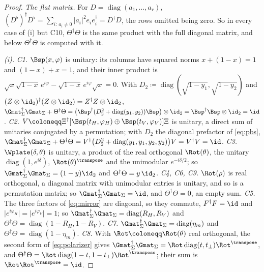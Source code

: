 \begin{proof}
\emph{The flat matrix.} For $D=\operatorname{diag}(a_1,\dots,a_r)$,
$(D^{\flat})^{\dagger}D^{\flat}=\sum_{i:\,a_i\ne0}\lvert a_i\rvert^{2}e_ie_i^{\dagger}
=D^{\dagger}D$, the rows omitted being zero. So in every case of (i) but C10,
$\Theta^{\dagger}\Theta$ is the same product with the full diagonal matrix,
and below $\Theta^{\dagger}\Theta$ is computed with it.

\emph{(i).} \emph{C1.} $\Bsp(x,\varphi)$ is unitary: its columns have
squared norms $x+(1-x)=1$ and $(1-x)+x=1$, and their inner product is
$\sqrt{x}\sqrt{1-x}\,e^{i\varphi}-\sqrt{1-x}\,e^{i\varphi}\sqrt{x}=0$. With
$D_2\coloneqq\operatorname{diag}(\sqrt{1-y_1},\sqrt{1-y_2})$ and
$(Z\otimes\id_2)^{\dagger}(Z\otimes\id_2)=Z^{\dagger}Z\otimes\id_2$,
$\Gmat_\Sigma^{\dagger}\Gmat_\Sigma+\Theta^{\dagger}\Theta
=\big(\Bsp^{\dagger}(D_2^{2}+\operatorname{diag}(y_1,y_2))\Bsp\big)\otimes\id_2
=\Bsp^{\dagger}\Bsp\otimes\id_2=\id$.
\emph{C2.} $V\coloneqq\Xi^{\dagger}[\Bsp(t_H,\varphi_H)\oplus\Bsp(t_V,\varphi_V)]\Xi$
is unitary, a direct sum of unitaries conjugated by a permutation; with
$D_2$ the diagonal prefactor of \eqref{eq:pbs},
$\Gmat_\Sigma^{\dagger}\Gmat_\Sigma+\Theta^{\dagger}\Theta
=V^{\dagger}\big(D_2^{2}+\operatorname{diag}(y_1,y_1,y_2,y_2)\big)V=V^{\dagger}V=\id$.
\emph{C3.} $\Wplate(\delta,\theta)$ is unitary, a product of the real
orthogonal $\Rot(\theta)$, the unitary $\operatorname{diag}(1,e^{i\delta})$,
$\Rot(\theta)^{\transpose}$ and the unimodular $e^{-i\delta/2}$; so
$\Gmat_\Sigma^{\dagger}\Gmat_\Sigma=(1-y)\id_2$ and
$\Theta^{\dagger}\Theta=y\,\id_2$.
\emph{C4, C6, C9.} $\Rot(\rho)$ is real orthogonal, a diagonal matrix with
unimodular entries is unitary, and so is a permutation matrix; so
$\Gmat_\Sigma^{\dagger}\Gmat_\Sigma=\id$, and $\Theta^{\dagger}\Theta=0$, an
empty sum.
\emph{C5.} The three factors of \eqref{eq:mirror} are diagonal, so they
commute, $F^{\dagger}F=\id$ and
$\lvert e^{i\varphi_H}\rvert=\lvert e^{i\varphi_V}\rvert=1$; so
$\Gmat_\Sigma^{\dagger}\Gmat_\Sigma=\operatorname{diag}(R_H,R_V)$ and
$\Theta^{\dagger}\Theta=\operatorname{diag}(1-R_H,1-R_V)$.
\emph{C7.} $\Gmat_\Sigma^{\dagger}\Gmat_\Sigma=\operatorname{diag}(\eta_m)$
and $\Theta^{\dagger}\Theta=\operatorname{diag}(1-\eta_m)$.
\emph{C8.} With $\Rot\coloneqq\Rot(\theta)$ real orthogonal, the second form
of \eqref{eq:polarizer} gives
$\Gmat_\Sigma^{\dagger}\Gmat_\Sigma=\Rot\operatorname{diag}(t,t_\perp)\Rot^{\transpose}$,
and $\Theta^{\dagger}\Theta=\Rot\operatorname{diag}(1-t,1-t_\perp)\Rot^{\transpose}$;
their sum is $\Rot\Rot^{\transpose}=\id$.

\end{proof}
